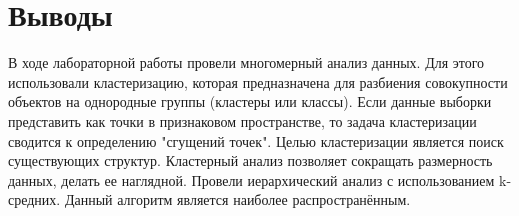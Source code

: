 \documentclass[a4paper,14pt]{extarticle}
\begin{document}
\section*{Выводы}
В ходе лабораторной работы провели многомерный анализ данных. Для этого
использовали кластеризацию, которая предназначена для разбиения совокупности
объектов на однородные группы (кластеры или классы). Если данные выборки
представить как точки в признаковом пространстве, то задача кластеризации
сводится к определению "сгущений точек". Целью кластеризации является поиск
существующих структур. Кластерный анализ позволяет сокращать размерность данных,
делать ее наглядной. Провели иерархический анализ с использованием k-средних.
Данный алгоритм является наиболее распространённым.
\end{document}
